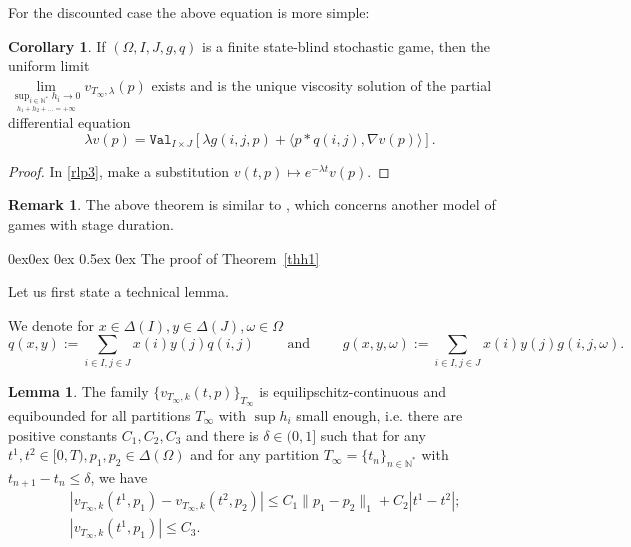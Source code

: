 \documentclass[english,openary,12pt]{article}
\makeatletter
\renewcommand\subsection{\@startsection{subsection}{2}{\z@}%
                                     {0ex\@plus 0ex \@minus 0ex}%
                                     {0.5ex \@plus 0ex}%
                                     {\normalfont\Large\bfseries}}%
\theoremstyle{definition}
\newtheorem{remark}{Remark}
\newtheorem{lemma}{Lemma}
\newtheorem{corollary}{Corollary}
\newcommand{\N}{\mathbb{N}}
\makeatother
\begin{document}
For the discounted case the above equation is more simple:

\begin{corollary}
\label{thh3}
If $(\Omega, I, J, 
g, q)$ is a finite state-blind stochastic game, then the uniform limit \\
$\lim\limits_{\underset{h_1+h_2+\ldots = +\infty}{\sup_{i\in\N^*} h_i \to 0}} 
v_{T_\infty,\lambda}(p)$ exists and is the unique viscosity solution of the partial differential equation
$$\lambda v(p) = \texttt{Val}_{I\times J} [\lambda g(i,j,p) + \langle p * q(i,j), \nabla v(p) \rangle].$$
\end{corollary}

\begin{proof}
In \eqref{rlp3}, make a substitution $v(t,p) \mapsto e^{-\lambda t} v(p)$.
\end{proof}

\begin{remark}
	The above theorem is similar to \cite[Proposition~5.3]{Sor17}, which concerns another model of games with stage duration.
\end{remark}

\subsection{The proof of Theorem~\ref{thh1}}
\label{thh10}

Let us first state a technical lemma.

We denote for $x \in \Delta(I), y\in \Delta(J), \omega \in \Omega$
$$
  q(x,y) := \sum_{i \in I, j \in J} x(i) y(j) q(i,j) \qquad \text{ and } \qquad
  g(x,y,\omega) := \sum_{i \in I, j \in J} x(i) y(j) g(i,j,\omega).
$$

\begin{lemma}
  \label{lemma_pr}
The family $\{v_{T_\infty,k}(t,p)\}_{T_\infty}$ 
is equilipschitz-continuous and equibounded for all partitions
$T_\infty$ with $\sup h_i$ small enough, i.e.
there are positive constants
$C_1, C_2, C_3$ and there is $\delta \in (0, 1]$ such that for any 
$t^1, t^2 \in [0, T), p_1, p_2 \in \Delta (\Omega)$ 
and for any partition 
$T_\infty =\{t_n\}_{n\in\N^*}$ with $t_{n+1} - t_n \le \delta$, we have
\begin{align*}
  &|v_{T_\infty,k}(t^1,p_1) - 
  v_{T_\infty,k}(t^2,p_2)| \le
  C_1 \|p_1 - p_2\|_1 + C_2|t^1 - t^2|;\\
  &|v_{T_\infty,k}(t^1, p_1)| \le C_3.
\end{align*}
\end{lemma}
\end{document}
